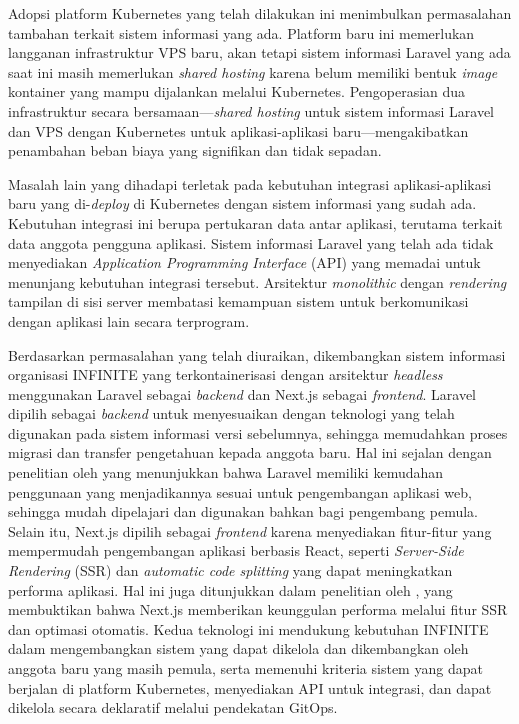 Adopsi platform Kubernetes yang telah dilakukan ini menimbulkan permasalahan tambahan terkait sistem informasi yang ada. Platform baru ini memerlukan langganan infrastruktur VPS baru, akan tetapi sistem informasi Laravel yang ada saat ini masih memerlukan \textit{shared hosting} karena belum memiliki bentuk \textit{image} kontainer yang mampu dijalankan melalui Kubernetes. Pengoperasian dua infrastruktur secara bersamaan---\textit{shared hosting} untuk sistem informasi Laravel dan VPS dengan Kubernetes untuk aplikasi-aplikasi baru---mengakibatkan penambahan beban biaya yang signifikan dan tidak sepadan.

Masalah lain yang dihadapi terletak pada kebutuhan integrasi aplikasi-aplikasi baru yang di-\textit{deploy} di Kubernetes dengan sistem informasi yang sudah ada. Kebutuhan integrasi ini berupa pertukaran data antar aplikasi, terutama terkait data anggota pengguna aplikasi. Sistem informasi Laravel yang telah ada tidak menyediakan \textit{Application Programming Interface} (API) yang memadai untuk menunjang kebutuhan integrasi tersebut. Arsitektur \textit{monolithic} dengan \textit{rendering} tampilan di sisi server membatasi kemampuan sistem untuk berkomunikasi dengan aplikasi lain secara terprogram.

Berdasarkan permasalahan yang telah diuraikan, dikembangkan sistem informasi organisasi INFINITE yang terkontainerisasi dengan arsitektur \textit{headless} menggunakan Laravel sebagai \textit{backend} dan Next.js sebagai \textit{frontend}. Laravel dipilih sebagai \textit{backend} untuk menyesuaikan dengan teknologi yang telah digunakan pada sistem informasi versi sebelumnya, sehingga memudahkan proses migrasi dan transfer pengetahuan kepada anggota baru. Hal ini sejalan dengan penelitian oleh \citet{Yadav_2019_Laravel} yang menunjukkan bahwa Laravel memiliki kemudahan penggunaan yang menjadikannya sesuai untuk pengembangan aplikasi web, sehingga mudah dipelajari dan digunakan bahkan bagi pengembang pemula. Selain itu, Next.js dipilih sebagai \textit{frontend} karena menyediakan fitur-fitur yang mempermudah pengembangan aplikasi berbasis React, seperti \textit{Server-Side Rendering} (SSR) dan \textit{automatic code splitting} yang dapat meningkatkan performa aplikasi. Hal ini juga ditunjukkan dalam penelitian oleh \citet{Silva_2018_IsomorphicPrerenderSPA}, yang membuktikan bahwa Next.js memberikan keunggulan performa melalui fitur SSR dan optimasi otomatis. Kedua teknologi ini mendukung kebutuhan INFINITE dalam mengembangkan sistem yang dapat dikelola dan dikembangkan oleh anggota baru yang masih pemula, serta memenuhi kriteria sistem yang dapat berjalan di platform Kubernetes, menyediakan API untuk integrasi, dan dapat dikelola secara deklaratif melalui pendekatan GitOps.

